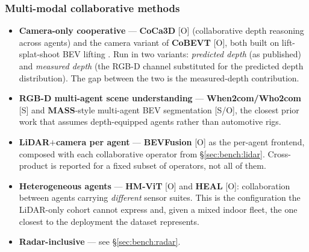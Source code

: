 \subsubsection{Multi-modal collaborative methods}
\label{sec:bench:multimodal}
\begin{itemize}
  \item \textbf{Camera-only cooperative} --- \textbf{CoCa3D} \cite{coca3d} [O]
        (collaborative depth reasoning across agents) and the camera variant of
        \textbf{CoBEVT} \cite{cobevt} [O], both built on lift-splat-shoot BEV
        lifting \cite{lss}. Run in two variants: \emph{predicted depth} (as
        published) and \emph{measured depth} (the RGB-D channel substituted for
        the predicted depth distribution). The gap between the two is the
        measured-depth contribution.
  \item \textbf{RGB-D multi-agent scene understanding} ---
        \textbf{When2com/Who2com} \cite{when2com,who2com} [S] and
        \textbf{MASS}-style multi-agent BEV segmentation \cite{mass} [S/O], the
        closest prior work that assumes depth-equipped agents rather than
        automotive rigs.
  \item \textbf{LiDAR${+}$camera per agent} --- \textbf{BEVFusion}
        \cite{bevfusion} [O] as the per-agent frontend, composed with each
        collaborative operator from \S\ref{sec:bench:lidar}. Cross-product is
        reported for a fixed subset of operators, not all of them.
  \item \textbf{Heterogeneous agents} --- \textbf{HM-ViT} \cite{hmvit} [O] and
        \textbf{HEAL} \cite{heal} [O]: collaboration between agents carrying
        \emph{different} sensor suites. This is the configuration the LiDAR-only
        cohort cannot express and, given a mixed indoor fleet, the one closest
        to the deployment the dataset represents.
  \item \textbf{Radar-inclusive} --- see \S\ref{sec:bench:radar}.
\end{itemize}

